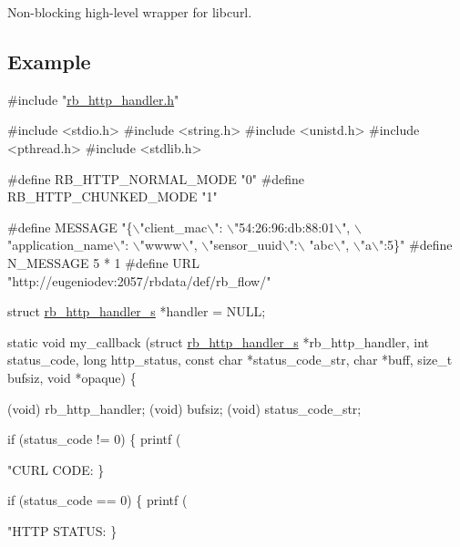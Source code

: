 Non-\/blocking high-\/level wrapper for libcurl.

\subsection*{Example}


\begin{DoxyCode}
\textcolor{preprocessor}{#include "\hyperlink{rb__http__handler_8h}{rb\_http\_handler.h}"}

\textcolor{preprocessor}{#include <stdio.h>}
\textcolor{preprocessor}{#include <string.h>}
\textcolor{preprocessor}{#include <unistd.h>}
\textcolor{preprocessor}{#include <pthread.h>}
\textcolor{preprocessor}{#include <stdlib.h>}

\textcolor{preprocessor}{#define RB\_HTTP\_NORMAL\_MODE  "0"}
\textcolor{preprocessor}{#define RB\_HTTP\_CHUNKED\_MODE "1"}

\textcolor{preprocessor}{#define MESSAGE "\{\(\backslash\)"client\_mac\(\backslash\)": \(\backslash\)"54:26:96:db:88:01\(\backslash\)", \(\backslash\)"application\_name\(\backslash\)": \(\backslash\)"wwww\(\backslash\)", \(\backslash\)"sensor\_uuid\(\backslash\)":\(\backslash\)
      "abc\(\backslash\)", \(\backslash\)"a\(\backslash\)":5\}"}
\textcolor{preprocessor}{#define N\_MESSAGE 5 * 1}
\textcolor{preprocessor}{#define URL "http://eugeniodev:2057/rbdata/def/rb\_flow/"}

\textcolor{keyword}{struct }\hyperlink{structrb__http__handler__s}{rb\_http\_handler\_s} *handler = NULL;

\textcolor{keyword}{static} \textcolor{keywordtype}{void} my\_callback (\textcolor{keyword}{struct} \hyperlink{structrb__http__handler__s}{rb\_http\_handler\_s} *rb\_http\_handler,
                         \textcolor{keywordtype}{int} status\_code,
                         \textcolor{keywordtype}{long} http\_status,
                         \textcolor{keyword}{const} \textcolor{keywordtype}{char} *status\_code\_str,
                         \textcolor{keywordtype}{char} *buff,
                         \textcolor{keywordtype}{size\_t} bufsiz,
                         \textcolor{keywordtype}{void} *opaque) \{

    (void) rb\_http\_handler;
    (void) bufsiz;
    (void) status\_code\_str;

    \textcolor{keywordflow}{if} (status\_code != 0) \{
        printf (\textcolor{stringliteral}{"CURL CODE: %
    \}

    \textcolor{keywordflow}{if} (status\_code == 0) \{
        printf (\textcolor{stringliteral}{"HTTP STATUS: %
    \}

}}
\end{DoxyCode}
